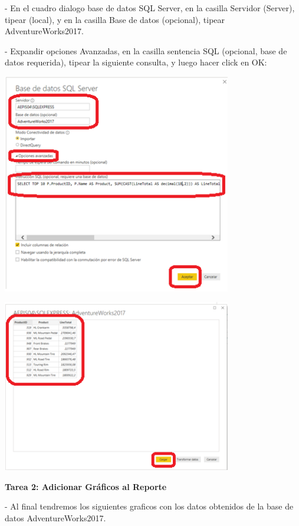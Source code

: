 \item{- En el cuadro dialogo base de datos SQL Server, en la casilla Servidor (Server), tipear (local), y en la casilla
Base de datos (opcional), tipear AdventureWorks2017.}
\item{- Expandir opciones Avanzadas, en la casilla sentencia SQL (opcional, base de datos requerida), tipear la
siguiente consulta, y luego hacer click en OK:}
\begin{center}
\includegraphics[width=10cm]{./Imagenes/image004}
\end{center}
\begin{center}
\includegraphics[width=10cm]{./Imagenes/image005}
\end{center}
\textbf{Tarea 2: Adicionar Gráficos al Reporte}
\item{- Al final tendremos los siguientes graficos con los datos obtenidos de la base de datos AdventureWorks2017. }
